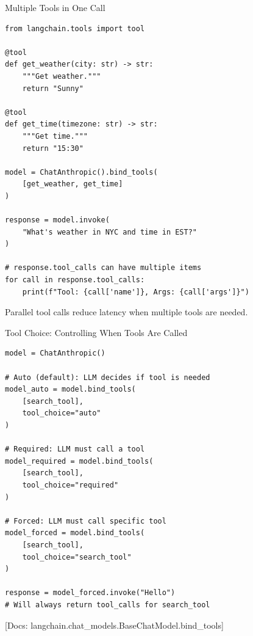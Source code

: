 \documentclass[aspectratio=169,11pt]{beamer}
\newcommand{\docref}[1]{{\scriptsize\color{docgray}[Docs: #1]}}
\begin{document}
\begin{frame}[fragile,shrink=3]{Multiple Tools in One Call}
\begin{codebox}
\begin{lstlisting}
from langchain.tools import tool

@tool
def get_weather(city: str) -> str:
    """Get weather."""
    return "Sunny"

@tool
def get_time(timezone: str) -> str:
    """Get time."""
    return "15:30"

model = ChatAnthropic().bind_tools(
    [get_weather, get_time]
)

response = model.invoke(
    "What's weather in NYC and time in EST?"
)

# response.tool_calls can have multiple items
for call in response.tool_calls:
    print(f"Tool: {call['name']}, Args: {call['args']}")
\end{lstlisting}
\end{codebox}

\begin{tipbox}[Efficiency]
Parallel tool calls reduce latency when multiple tools are needed.
\end{tipbox}
\end{frame}

\begin{frame}[fragile,shrink=3]{Tool Choice: Controlling When Tools Are Called}
\begin{codebox}
\begin{lstlisting}
model = ChatAnthropic()

# Auto (default): LLM decides if tool is needed
model_auto = model.bind_tools(
    [search_tool],
    tool_choice="auto"
)

# Required: LLM must call a tool
model_required = model.bind_tools(
    [search_tool],
    tool_choice="required"
)

# Forced: LLM must call specific tool
model_forced = model.bind_tools(
    [search_tool],
    tool_choice="search_tool"
)

response = model_forced.invoke("Hello")
# Will always return tool_calls for search_tool
\end{lstlisting}
\end{codebox}

\textcolor{docgray}{\docref{langchain.chat\_models.BaseChatModel.bind\_tools}}
\end{frame}
\end{document}
